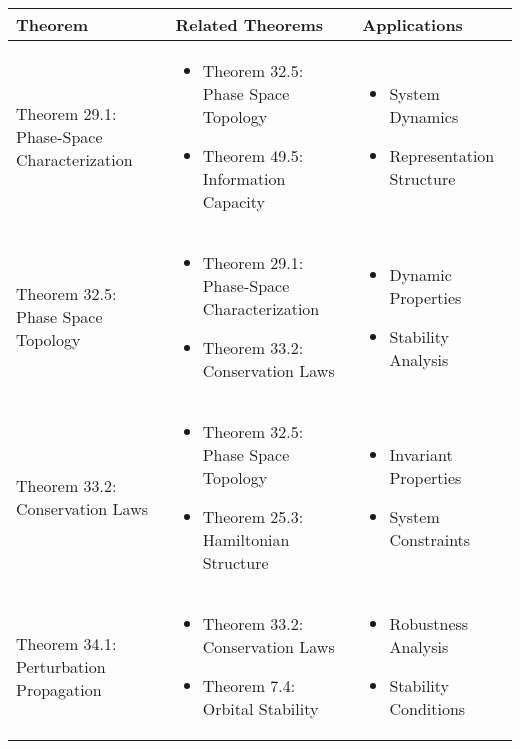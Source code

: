\begin{table}[h]
\centering
\begin{tabular}{|l|p{7cm}|p{4cm}|}
\hline
\textbf{Theorem} & \textbf{Related Theorems} & \textbf{Applications} \\
\hline
Theorem 29.1: Phase-Space Characterization &
\begin{itemize}
    \item Theorem 32.5: Phase Space Topology
    \item Theorem 49.5: Information Capacity
\end{itemize} &
\begin{itemize}
    \item System Dynamics
    \item Representation Structure
\end{itemize} \\
\hline
Theorem 32.5: Phase Space Topology &
\begin{itemize}
    \item Theorem 29.1: Phase-Space Characterization
    \item Theorem 33.2: Conservation Laws
\end{itemize} &
\begin{itemize}
    \item Dynamic Properties
    \item Stability Analysis
\end{itemize} \\
\hline
Theorem 33.2: Conservation Laws &
\begin{itemize}
    \item Theorem 32.5: Phase Space Topology
    \item Theorem 25.3: Hamiltonian Structure
\end{itemize} &
\begin{itemize}
    \item Invariant Properties
    \item System Constraints
\end{itemize} \\
\hline
Theorem 34.1: Perturbation Propagation &
\begin{itemize}
    \item Theorem 33.2: Conservation Laws
    \item Theorem 7.4: Orbital Stability
\end{itemize} &
\begin{itemize}
    \item Robustness Analysis
    \item Stability Conditions

\end{itemize}
\end{tabular}
\end{table}

